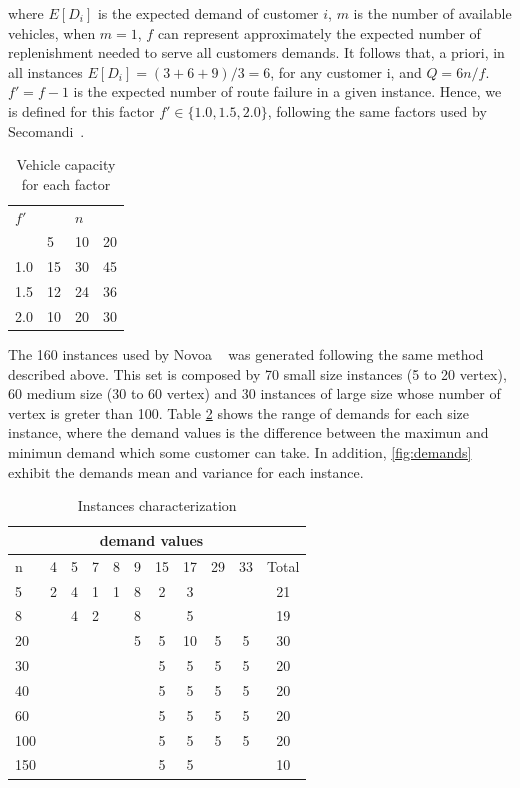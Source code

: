 where $E[D_i]$ is the expected demand of customer $i$, $m$ is the number of available vehicles, when $m = 1$, $f$ can represent approximately the expected number of replenishment needed to serve all customers demands. It follows that, a priori, in all instances $E[D_i]=(3+6+9)/3=6$, for any customer i, and $Q=6n/f$. $f'=f-1$ is the expected number of route failure in a given instance. Hence, we is defined for this factor $f' \in \{1.0, 1.5, 2.0\}$, following the same factors used by Secomandi~\cite{secomandi_comparing_2000}.

\begin{table}[!h]
  \centering
  \caption{Vehicle capacity for each factor}\label{tb:Q}
\begin{tabular}{l l l l}
  \hline
  $f'$ &   & $n$ &   \\
  \cline{2-4}
      & 5 & 10 & 20 \\
  \hline
  1.0 & 15 & 30 & 45 \\
  1.5 & 12 & 24 & 36 \\
  2.0 & 10 & 20 & 30 \\
  \hline
\end{tabular}
\end{table}



The 160 instances used by Novoa ~\cite{novoa_approximate_2009} was generated following the same method described above. This set is composed by 70 small size instances (5 to 20 vertex), 60 medium size (30 to 60 vertex) and 30 instances of large size whose number of vertex is greter than 100. Table \ref{tb:instances_characterization} shows the range of demands for each size instance, where the demand values is the difference between the maximun and minimun demand which some customer can take. In addition, \ref{fig:demands} exhibit the demands mean and variance for each instance.


\begin{table}[!h]
\centering
\begin{tabular}{| l | c c c c c c c c c | c |}
\hline
 & \multicolumn{9}{c|}{demand values} & \\ 
\hline
n & 4 & 5 & 7 & 8 & 9 & 15 & 17 & 29 & 33 & Total \\
\hline
5 & 2 & 4 & 1 & 1 & 8 & 2 & 3 &  &  & 21 \\ 
8 &  & 4 & 2 &  & 8 &  & 5 &  &  & 19 \\ 
20 &  &  &  &  & 5 & 5 & 10 & 5 & 5 & 30 \\ 
30 &  &  &  &  &  & 5 & 5 & 5 & 5 & 20 \\ 
40 &  &  &  &  &  & 5 & 5 & 5 & 5 & 20 \\ 
60 &  &  &  &  &  & 5 & 5 & 5 & 5 & 20 \\ 
100 &  &  &  &  &  & 5 & 5 & 5 & 5 & 20 \\ 
150 &  &  &  &  &  & 5 & 5 &  &  & 10 \\ 
\hline
\end{tabular}
\caption{Instances characterization}\label{tb:instances_characterization}
\end{table}


